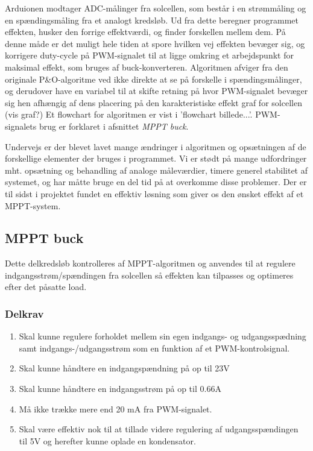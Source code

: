 \documentclass[../main.tex]{subfiles}
\begin{document}
    Arduionen modtager ADC-målinger fra solcellen, som består i en strømmåling og en spændingsmåling fra et analogt kredsløb. Ud fra dette beregner programmet effekten, husker den forrige effektværdi, og finder forskellen mellem dem. På denne måde er det muligt hele tiden at spore hvilken vej effekten bevæger sig, og korrigere duty-cycle på PWM-signalet til at ligge omkring et arbejdspunkt for maksimal effekt, som bruges af buck-konverteren. Algoritmen afviger fra den originale P\&O-algoritme ved ikke direkte at se på forskelle i spændingsmålinger, og derudover have en variabel til at skifte retning på hvor PWM-signalet bevæger sig hen afhængig af dens placering på den karakteristiske effekt graf for solcellen (vis graf?) Et flowchart for algoritmen er vist i 'flowchart billede...'. 
    PWM-signalets brug er forklaret i afsnittet \textit{MPPT buck}.

    Undervejs er der blevet lavet mange ændringer i algoritmen og opsætningen af de forskellige elementer der bruges i programmet. Vi er stødt på mange udfordringer mht. opsætning og behandling af analoge måleværdier, timere generel stabilitet af systemet, og har måtte bruge en del tid på at overkomme disse problemer. Der er til sidst i projektet fundet en effektiv løsning som giver os den ønsket effekt af et MPPT-system.


    \subsection{MPPT buck}
        Dette delkredsløb kontrolleres af MPPT-algoritmen og anvendes til at regulere indgangsstrøm/spændingen fra solcellen så effekten kan tilpasses og optimeres efter det påsatte load.
        
        \subsubsection{Delkrav}

            \begin{enumerate}
                \item Skal kunne regulere forholdet mellem sin egen indgangs- og udgangsspædning samt indgangs-/udgangsstrøm som en funktion af et PWM-kontrolsignal.
                \item Skal kunne håndtere en indgangspændning på op til 23V
                \item Skal kunne håndtere en indgangsstrøm på op til 0.66A
                \item Må ikke trække mere end 20 mA fra PWM-signalet.
                \item Skal være effektiv nok til at tillade videre regulering af udgangsspændingen til 5V og herefter kunne oplade en kondensator.
            \end{enumerate}
            
\end{document}

